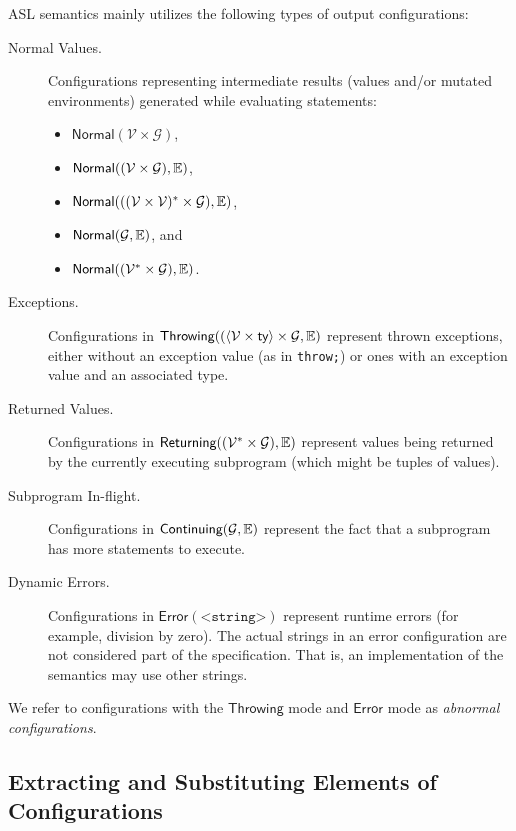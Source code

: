 \documentclass{book}
\newcommand\XGraphs[0]{\mathcal{G}}
\newcommand\vals[0]{\mathcal{V}}
\newcommand\Normal[0]{\textsf{Normal}}
\newcommand\Throwing[0]{\textsf{Throwing}}
\newcommand\Continuing[0]{\textsf{Continuing}}
\newcommand\Returning[0]{\textsf{Returning}}
\newcommand\Error[0]{\textsf{Error}}
\begin{document}
ASL semantics mainly utilizes the following types of output configurations:
\begin{description}
  \item[Normal Values.] Configurations representing intermediate results
  (values and/or mutated environments) generated while evaluating statements:
  \begin{itemize}
  \item $\Normal(\vals \times \XGraphs)$,
  \item $\Normal((\vals \times \XGraphs), \envs)$,
  \item $\Normal(((\vals \times \vals)^* \times \XGraphs), \envs)$,
  \item $\Normal(\XGraphs, \envs)$, and
  \item $\Normal((\vals^* \times \XGraphs), \envs)$.
  \end{itemize}

  \item[Exceptions.] Configurations in $\Throwing((\langle\vals \times \ty\rangle \times \XGraphs, \envs)$
  represent thrown exceptions,
  either without an exception value (as in \texttt{throw;}) or ones with an exception value and an associated type.

  \item[Returned Values.] Configurations in $\Returning((\vals^* \times \XGraphs), \envs)$
  represent values being returned by the currently executing subprogram
  (which might be tuples of values).

  \item[Subprogram In-flight.] Configurations in $\Continuing(\XGraphs, \envs)$
  represent the fact that a subprogram has more statements to execute.

  \item[Dynamic Errors.] Configurations in $\Error(\texttt{<string>})$
  represent runtime errors (for example, division by zero).
  The actual strings in an error configuration are not considered part of the specification.
  That is, an implementation of the semantics may use other strings.
\end{description}

We refer to configurations with the $\Throwing$ mode and $\Error$ mode as \emph{abnormal configurations}.

\subsection{Extracting and Substituting Elements of Configurations}
\end{document}
